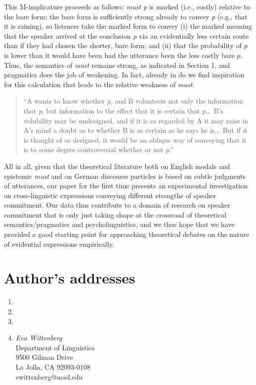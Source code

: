 \documentclass[11pt]{article}
\begin{document}
This M-implicature proceeds as follows: \emph{must p} is marked (i.e., costly) relative to the bare form; the bare form is sufficiently strong already to convey \emph{p} (e.g., that it is raining), so listeners take the marked form to convey (i) the marked meaning that the speaker arrived at the conclusion \emph{p} via an evidentially less certain route than if they had chosen the shorter, bare form; and (ii) that the probability of \emph{p} is lower than it would have been had the utterance been the less costly bare $p$. Thus, the semantics of \emph{must} remains strong, as indicated in Section 1, and pragmatics does the job of weakening. In fact, already in \citet[pp.~33--34]{grice1989} do we find inspiration for this calculation that leads to the relative weakness of \emph{must}:

\begin{quotation}
``A wants to know whether \emph{p}, and B volunteers not only the information that \emph{p}, but information to the effect that it is certain that \emph{p}\ldots\ B's volubility may be undesigned, and if it is so regarded by A it may raise in A's mind a doubt as to whether B is as certain as he says he is\ldots\ But if it is thought of as designed, it would be an oblique way of conveying that it is to some degree controversial whether or not \emph{p}.''
\end{quotation}


All in all, given that the theoretical literature both on English modals and epistemic \emph{must} and on German discourse particles is based on subtle judgments of utterances, our paper for the first time presents an experimental investigation on cross-linguistic expressions conveying different strengths of speaker commitment. Our data thus contribute to a domain of research on speaker commitment that is only just taking shape at the crossroad of theoretical semantics/pragmatics and psycholinguistics, and we thus hope that we have provided a good starting point for approaching theoretical debates on the nature of evidential expressions empirically.





\section*{Author's addresses}
\begin{enumerate}
\item 
\item
\item
\item \emph{Eva Wittenberg}\\ Department of Linguistics \\ 9500 Gilman Drive\\
La Jolla, CA 92093-0108\\ ewittenberg@ucsd.edu
\end{enumerate}
\end{document}
